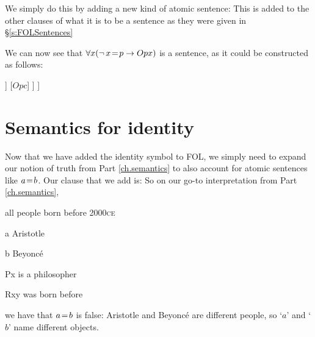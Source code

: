 We simply do this by adding a new kind of atomic sentence:  
This is added to the other clauses of what it is to be a sentence as they were given in \S\ref{s:FOLSentences}

We can now see that $\forall x (\enot\, x\eid p \eif Opx)$ is a sentence, as it could be constructed as follows:	\begin{center}
	\begin{forest}
		[$\forall x (\enot\, x\eid p \eif Opx)$
			[$(\enot\, c\eid p\eif Opc)$
				[$\enot\, c\eid p$
					[$c\eid p$]
				]
				[$Opc$]
			]
		]
	\end{forest}
	\end{center} 

\section{Semantics for identity}

%

Now that we have added the identity symbol to FOL, we simply need to expand our notion of truth from Part \ref{ch.semantics} to also account for atomic sentences like $a\!=\! b$. Our clause that we add is:
So on our go-to interpretation from Part \ref{ch.semantics}, 
\begin{ekey}
		\item[\text{domain}] all people born before 2000\textsc{ce}
		\item[a] Aristotle
		\item[b] Beyonc\'e
		\item[Px]  is a philosopher
		\item[Rxy]  was born before 
	\end{ekey} we have that $a\!=\! b$ is false: Aristotle and Beyonc\'e are different people, so `$a$' and `$b$' name different objects. 

